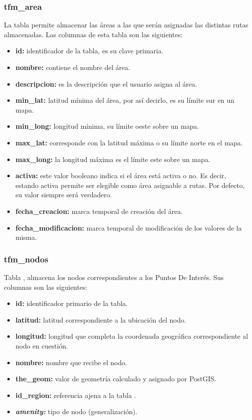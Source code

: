 \subsubsection{tfm\_area}
La tabla  permite almacenar las áreas a las que serán asignadas las distintas rutas almacenadas. Las columnas de esta tabla son las siguientes:

\begin{itemize}
	\item \textbf{id:} identificador de la tabla, es su clave primaria.
	\item \textbf{nombre:} contiene el nombre del área.
	\item \textbf{descripcion:} es la descripción que el usuario asigna al área.
	\item \textbf{min\_lat:} latitud mínima del área, por así decirlo, es su límite sur en un mapa.
	\item \textbf{min\_long:} longitud mínima, su límite oeste sobre un mapa.
	\item \textbf{max\_lat:} corresponde con la latitud máxima o su límite norte en el mapa.
	\item \textbf{max\_long:} la longitud máxima es el límite este sobre un mapa.
	\item \textbf{activa:} este valor booleano indica si el área está activa o no. Es decir, estando activa permite ser elegible como área asignable a rutas. Por defecto, su valor siempre será verdadero. 
	\item \textbf{fecha\_creacion:} marca temporal de creación del área.
	\item \textbf{fecha\_modificacion:} marca temporal de modificación de los valores de la misma.
\end{itemize}

\subsubsection{tfm\_nodos}
Tabla , almacena los nodos correspondientes a los Puntos De Interés. Sus columnas son las siguientes:

\begin{itemize}
	\item \textbf{id:} identificador primario de la tabla.
	\item \textbf{latitud:} latitud correspondiente a la ubicación del nodo.
	\item \textbf{longitud:} longitud que completa la coordenada geográfica correspondiente al nodo en cuestión.
	\item \textbf{nombre:} nombre que recibe el nodo.
	\item \textbf{the\_geom:} valor de geometría calculado y asignado por PostGIS.
	\item \textbf{id\_region:} referencia ajena a la tabla .
	\item \textbf{\textit{amenity:}} tipo de nodo (generalización).
\end{itemize}

